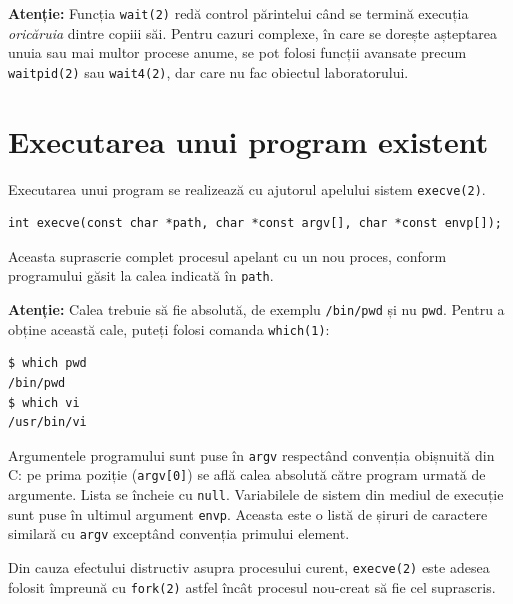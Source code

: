 \documentclass[12pt,a4paper]{article}
\begin{document}
\begin{mdframed}[linecolor=gray, linewidth=0.5pt, backgroundcolor=gray!7,
  innertopmargin=6pt, innerbottommargin=6pt]
  \textbf{Atenție:} Funcția \texttt{wait(2)} redă control părintelui 
  când se termină execuția \textit{oricăruia} dintre copiii săi. 
  Pentru cazuri complexe, în care se dorește 
  așteptarea unuia sau mai multor procese anume, 
  se pot folosi funcții avansate precum 
  \texttt{waitpid(2)} sau \texttt{wait4(2)}, 
  dar care nu fac obiectul laboratorului.
\end{mdframed}

\section{Executarea unui program existent}

Executarea unui program se realizează cu ajutorul apelului sistem \texttt{execve(2)}.

\begin{lstlisting}
int execve(const char *path, char *const argv[], char *const envp[]);
\end{lstlisting}

Aceasta suprascrie complet procesul apelant cu un nou proces, 
conform programului găsit la calea indicată în \texttt{path}.

\begin{mdframed}[linecolor=gray, linewidth=0.5pt, backgroundcolor=gray!7,
  innertopmargin=6pt, innerbottommargin=6pt]
  \textbf{Atenție:} Calea trebuie să fie absolută, 
  de exemplu \texttt{/bin/pwd} și nu \texttt{pwd}. 
  Pentru a obține această cale, puteți folosi comanda \texttt{which(1)}:
  \begin{lstlisting}[style=shell]
$ which pwd
/bin/pwd
$ which vi
/usr/bin/vi
  \end{lstlisting}
\end{mdframed}

Argumentele programului sunt puse în \texttt{argv} 
respectând convenția obișnuită din C:
pe prima poziție (\texttt{argv[0]}) se află calea absolută 
către program urmată de argumente.
Lista se încheie cu \texttt{null}. 
Variabilele de sistem din mediul de execuție sunt puse în
ultimul argument \texttt{envp}. 
Aceasta este o listă de șiruri de caractere similară cu
\texttt{argv} exceptând convenția primului element.

Din cauza efectului distructiv asupra procesului curent, 
\texttt{execve(2)} este adesea folosit împreună cu 
\texttt{fork(2)} astfel încât procesul nou-creat să fie cel suprascris.
\end{document}
